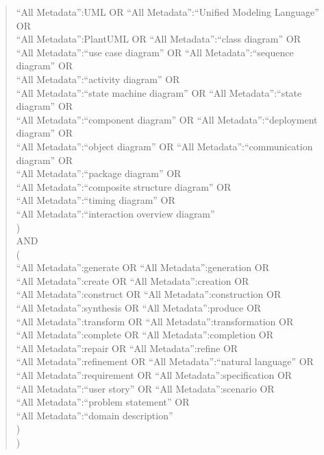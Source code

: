 \begin{quote}
\begin{minipage}{0.96\textwidth}
\qquad ``All Metadata'':UML OR ``All Metadata'':``Unified Modeling Language'' OR\\
\qquad ``All Metadata'':PlantUML OR ``All Metadata'':``class diagram'' OR\\
\qquad ``All Metadata'':``use case diagram'' OR ``All Metadata'':``sequence diagram'' OR\\
\qquad ``All Metadata'':``activity diagram'' OR\\
\qquad ``All Metadata'':``state machine diagram'' OR ``All Metadata'':``state diagram'' OR\\
\qquad ``All Metadata'':``component diagram'' OR ``All Metadata'':``deployment diagram'' OR\\
\qquad ``All Metadata'':``object diagram'' OR ``All Metadata'':``communication diagram'' OR\\
\qquad ``All Metadata'':``package diagram'' OR\\
\qquad ``All Metadata'':``composite structure diagram'' OR\\
\qquad ``All Metadata'':``timing diagram'' OR\\
\qquad ``All Metadata'':``interaction overview diagram''\\
\quad )\\
\quad AND\\
\quad (\\
\qquad ``All Metadata'':generate OR ``All Metadata'':generation OR\\
\qquad ``All Metadata'':create OR ``All Metadata'':creation OR\\
\qquad ``All Metadata'':construct OR ``All Metadata'':construction OR\\
\qquad ``All Metadata'':synthesis OR ``All Metadata'':produce OR\\
\qquad ``All Metadata'':transform OR ``All Metadata'':transformation OR\\
\qquad ``All Metadata'':complete OR ``All Metadata'':completion OR\\
\qquad ``All Metadata'':repair OR ``All Metadata'':refine OR\\
\qquad ``All Metadata'':refinement OR ``All Metadata'':``natural language'' OR\\
\qquad ``All Metadata'':requirement OR ``All Metadata'':specification OR\\
\qquad ``All Metadata'':``user story'' OR ``All Metadata'':scenario OR\\
\qquad ``All Metadata'':``problem statement'' OR\\
\qquad ``All Metadata'':``domain description''\\
\quad )\\
)
\end{minipage}
\end{quote}

